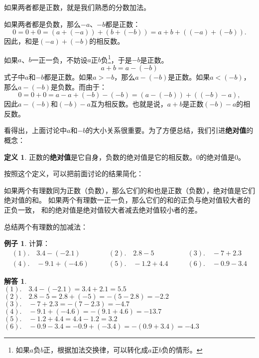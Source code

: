 \documentclass[12pt,UTF8]{ctexbook}
\theoremstyle{definition}
\newtheorem{df}{定义}[section]
\newtheorem{ex}{例子}[section]
\newtheorem*{so}{解答}
\theoremstyle{plain}
\begin{document}
如果两者都是正数，就是我们熟悉的分数加法。

如果两者都是负数，那么$-a$、$-b$都是正数：
$$ 0 = 0 + 0 = (a +(-a)) + (b + (-b)) = a + b + \left((-a) + (-b)\right).$$
因此，和是$(-a) + (-b)$的相反数。

如果$a$、$b$一正一负，不妨设$a$正$b$负\footnote{如果$a$负$b$正，根据加法交换律，可以转化成$a$正$b$负的情形。}，于是$-b$是正数。
$$ a + b = a - (-b)$$
式子中$a$和$-b$都是正数。如果$a > -b$，那么$a - (-b)$是正数。如果$a < (-b)$，那么$a - (-b)$是负数。而由于：
$$ 0 = 0 + 0 = a - a + (-b) - (-b) = \left(a - (-b)\right) + \left((-b) - a\right),$$
因此$a - (-b)$和$(-b) - a$互为相反数。也就是说，$a + b$是正数$(-b) - a$的相反数。

看得出，上面讨论中$a$和$-b$的大小关系很重要。为了方便总结，我们引进\textbf{绝对值}的概念：
\begin{df}\label{df:3-0-0}
    正数的\textbf{绝对值}是它自身，负数的绝对值是它的相反数。$0$的绝对值是$0$。
\end{df}
按照这个定义，可以把前面讨论的结果简化：

如果两个有理数同为正数（负数），那么它们的和也是正数（负数），绝对值是它们绝对值的和。
如果两个有理数一正一负，那么它们的和的正负与绝对值较大者的正负一致，
和的绝对值是绝对值较大者减去绝对值较小者的差。

总结两个有理数的加减法：
\begin{center}
\end{center}

\begin{ex}
    计算：
    $$
    \begin{array}{lll}
        (1). \quad 3.4 - (-2.1) \quad & \quad (2). \quad 2.8 - 5 \quad & \quad (3). \quad -7 + 2.3 \\
        (4). \quad -9.1 + (-4.6) \quad & \quad (5). \quad -1.2 + 4.4 \quad & \quad (6). \quad -0.9 - 3.4
    \end{array}
    $$
\end{ex}
\begin{so}
    \mbox{}\\
    \indent $(1). \quad 3.4 - (-2.1) = 3.4 + 2.1 = 5.5$ \\
    \indent $(2). \quad 2.8 - 5 = 2.8 + (-5) = -(5 - 2.8) = -2.2$ \\
    \indent $(3). \quad -7 + 2.3 = -(7 - 2.3) = -4.7$ \\
    \indent $(4). \quad -9.1 + (-4.6) = -(9.1 + 4.6) = -13.7$ \\
    \indent $(5). \quad -1.2 + 4.4 = 4.4 - 1.2 = 3.2$ \\
    \indent $(6). \quad -0.9 - 3.4 = -0.9 + (-3.4) = -(0.9 + 3.4) = -4.3 $ 
\end{so}
\end{document}
